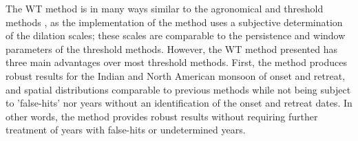 


The WT method is in many ways similar to the agronomical and threshold methods \citep[e.g.][]{liebmann2001interannual,moron2014interannual}, as the implementation of the method uses a subjective determination of the dilation scales; these scales are comparable to the persistence and window parameters of the threshold methods. However, the WT method presented has three main advantages over most threshold methods. First, the method produces robust results for the Indian and North American monsoon of onset and retreat, and spatial distributions comparable to previous methods \citep{moron2014interannual} while not being subject to 'false-hits' nor years without an identification of the onset and retreat dates. In other words, the method provides robust results without requiring further treatment of years with false-hits or undetermined years. 

